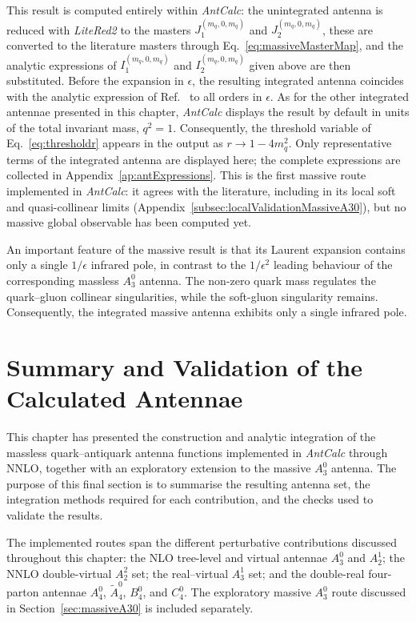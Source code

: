 This result is computed entirely within \textit{AntCalc}: the unintegrated antenna is reduced with
\textit{LiteRed2} to the masters $J_1^{(m_q,0,m_q)}$ and $J_2^{(m_q,0,m_q)}$, these are converted to the
literature masters through Eq.~\eqref{eq:massiveMasterMap}, and the analytic expressions of
$I_1^{(m_q,0,m_q)}$ and $I_2^{(m_q,0,m_q)}$ given above are then substituted. Before the expansion in
$\epsilon$, the resulting integrated antenna coincides with the analytic expression of
Ref.~\cite{GehrmannDeRidder:2009fz} to all orders in $\epsilon$.
As for the other integrated antennae presented in this chapter, \textit{AntCalc} displays the
result by default in units of the total invariant mass, $q^2=1$. Consequently, the threshold
variable of Eq.~\eqref{eq:thresholdr} appears in the output as $r\to1-4m_q^2$. Only representative terms of the
integrated antenna are displayed here; the complete expressions are collected in
Appendix~\ref{ap:antExpressions}. This is the first massive route implemented in \textit{AntCalc}: it agrees with the literature, including in its local soft and quasi-collinear limits (Appendix~\ref{subsec:localValidationMassiveA30}), but no massive global observable has been computed yet.

An important feature of the massive result is that its Laurent expansion contains only a single
$1/\epsilon$ infrared pole, in contrast to the $1/\epsilon^2$ leading behaviour of the
corresponding massless $A_3^0$ antenna. The non-zero quark mass regulates the quark--gluon
collinear singularities, while the soft-gluon singularity remains. Consequently, the integrated
massive antenna exhibits only a single infrared pole.

\section{Summary and Validation of the Calculated Antennae}\label{sec:masterValidationOverview}

This chapter has presented the construction and analytic integration of the massless quark--antiquark
antenna functions implemented in \textit{AntCalc} through NNLO, together with an exploratory extension
to the massive $A_3^0$ antenna. The purpose of this final section is to summarise the resulting antenna
set, the integration methods required for each contribution, and the checks used to validate the
results.

The implemented routes span the different perturbative contributions discussed throughout this
chapter: the NLO tree-level and virtual antennae $A_3^0$ and $A_2^1$; the NNLO double-virtual $A_2^2$
set; the real--virtual $A_3^1$ set; and the double-real four-parton antennae $A_4^0$, $\tilde A_4^0$,
$B_4^0$, and $C_4^0$. The exploratory massive $A_3^0$ route discussed in
Section~\ref{sec:massiveA30} is included separately.

